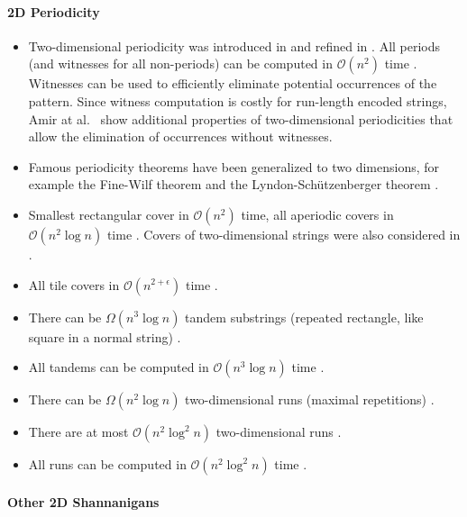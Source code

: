 \documentclass[11pt]{article}
\renewcommand{\O}{\mathcal{O}}
\theoremstyle{plain}
\theoremstyle{definition}
\theoremstyle{remark}
\begin{document}
\paragraph{2D Periodicity}

\begin{itemize}
	\item Two-dimensional periodicity was introduced in \cite{Amir1992,Amir1998} and refined in \cite{Galil1996}. All periods (and witnesses for all non-periods) can be computed in $\O(n^2)$ time \cite{Cole2004}. Witnesses can be used to efficiently eliminate potential occurrences of the pattern. Since witness computation is costly for run-length encoded strings, Amir at al.\ \cite{Amir1997} show additional properties of two-dimensional periodicities that allow the elimination of occurrences without witnesses.
	\item Famous periodicity theorems have been generalized to two dimensions, for example the Fine-Wilf theorem \cite{Fine1965,Mignosi2003} and the Lyndon-Schützenberger theorem \cite{Lyndon1962,Gamard2017}.
	\item Smallest rectangular cover in $\O(n^2)$ time, all aperiodic covers in $\O(n^2 \log n)$ time \cite{Charalampopoulos2021}. Covers of two-dimensional strings were also considered in \cite{Gamard2019,Crochemore1998a}. 
	\item All tile covers in $\O(n^{2+\epsilon})$ time \cite{Radoszewski2022}.
	\item There can be $\Omega(n^3 \log n)$ tandem substrings (repeated rectangle, like square in a normal string) \cite{Apostolico2000}.
	\item All tandems can be computed in $\O(n^3 \log n)$ time \cite{Apostolico2005}.
	\item There can be $\Omega(n^2 \log n)$ two-dimensional runs (maximal repetitions) \cite{Gawrychowski2021}.
	\item There are at most $\O(n^2 \log^2 n)$ two-dimensional runs \cite{Charalampopoulos2020}.
	\item All runs can be computed in $\O(n^2 \log^2 n)$ time \cite{Amir2020}.

\end{itemize}


\paragraph{Other 2D Shannanigans}
\end{document}
